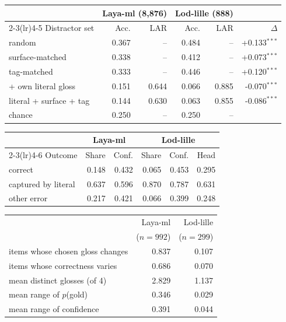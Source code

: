 \begin{tabular}{lrrrrr}
\toprule
& \multicolumn{2}{c}{Laya-ml (8{,}876)} & \multicolumn{2}{c}{Lod-lille (888)} & \\
\cmidrule(lr){2-3}\cmidrule(lr){4-5}
Distractor set & Acc. & LAR & Acc. & LAR & $\Delta$ \\
\midrule
random & 0.367 & -- & 0.484 & -- & +0.133$^{***}$ \\
surface-matched & 0.338 & -- & 0.412 & -- & +0.073$^{***}$ \\
tag-matched & 0.333 & -- & 0.446 & -- & +0.120$^{***}$ \\
+ own literal gloss & 0.151 & 0.644 & 0.066 & 0.885 & -0.070$^{***}$ \\
literal + surface + tag & 0.144 & 0.630 & 0.063 & 0.855 & -0.086$^{***}$ \\
\midrule
chance & 0.250 & -- & 0.250 & -- & \\
\bottomrule
\end{tabular}

\begin{tabular}{lrrrrr}
\toprule
& \multicolumn{2}{c}{Laya-ml} & \multicolumn{3}{c}{Lod-lille} \\
\cmidrule(lr){2-3}\cmidrule(lr){4-6}
Outcome & Share & Conf. & Share & Conf. & Head \\
\midrule
correct & 0.148 & 0.432 & 0.065 & 0.453 & 0.295 \\
captured by literal & 0.637 & 0.596 & 0.870 & 0.787 & 0.631 \\
other error & 0.217 & 0.421 & 0.066 & 0.399 & 0.248 \\
\bottomrule
\end{tabular}

\begin{tabular}{lrr}
\toprule
& Laya-ml & Lod-lille \\
& ($n{=}992$) & ($n{=}299$) \\
\midrule
items whose chosen gloss changes & 0.837 & 0.107 \\
items whose correctness varies & 0.686 & 0.070 \\
mean distinct glosses (of 4) & 2.829 & 1.137 \\
mean range of $p$(gold) & 0.346 & 0.029 \\
mean range of confidence & 0.391 & 0.044 \\
\bottomrule
\end{tabular}

